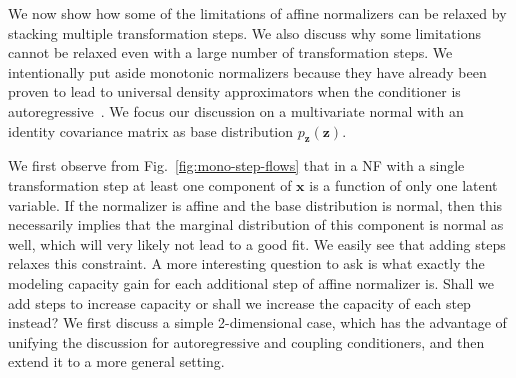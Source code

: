 \documentclass{article}
\newcommand{\mb}{\boldsymbol}
\newcommand{\figref}[1]{Fig.~\ref{#1}}
\begin{document}
We now show how some of the limitations of affine normalizers can be relaxed by stacking multiple transformation steps. 
We also discuss why some limitations cannot be relaxed even with a large number of transformation steps. We intentionally put aside monotonic normalizers because they have already been proven to lead to universal density approximators when the conditioner is autoregressive~\cite{NAF}. 
We focus our discussion on a multivariate normal with an identity covariance matrix as base distribution $p_{\mb{z}}(\mb{z})$. %

We first observe from \figref{fig:mono-step-flows} that in a NF with a single transformation step at least one component of $\mb{x}$ is a function of only one latent variable.
If the normalizer is affine and the base distribution is normal, then this necessarily implies that the marginal distribution of this component is normal as well, which will very likely not lead to a good fit.
We easily see that adding steps relaxes this constraint.
A more interesting question to ask is what exactly the modeling capacity gain for each additional step of affine normalizer is. Shall we add steps to increase capacity or shall we increase the capacity of each step instead?
We first discuss a simple 2-dimensional case, which has the advantage of unifying the discussion for autoregressive and coupling conditioners, and then extend it to a more general setting.
\end{document}
